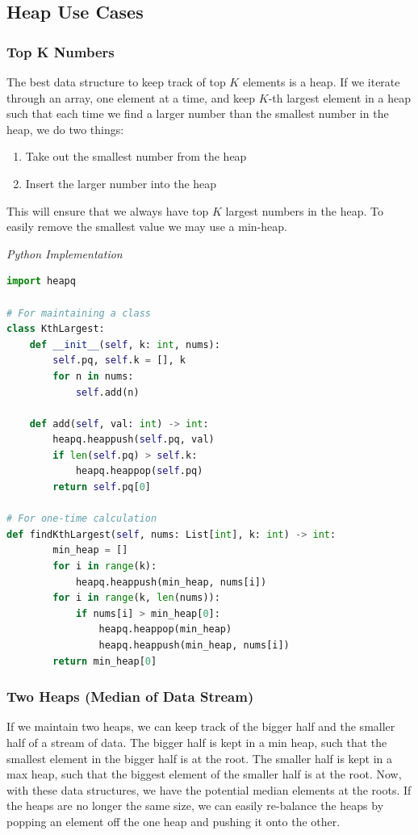 \documentclass{article}
\begin{document}
    \subsection{Heap Use Cases}
    \subsubsection{Top K Numbers}
    The best data structure to keep track of top $K$ elements is a heap. If we iterate through an array, one element at a time, and keep $K$-th largest element in a heap such that each time we find a larger number than the smallest number in the heap, we do two things:
    \begin{enumerate}
        \item Take out the smallest number from the heap
        \item Insert the larger number into the heap
    \end{enumerate}
    This will ensure that we always have top $K$ largest numbers in the heap. To easily remove the smallest value we may use a min-heap.

\vspace{8pt} \emph{Python Implementation}
\begin{lstlisting}[language=Python]
import heapq

# For maintaining a class
class KthLargest:
    def __init__(self, k: int, nums):
        self.pq, self.k = [], k
        for n in nums:
            self.add(n)

    def add(self, val: int) -> int:
        heapq.heappush(self.pq, val)
        if len(self.pq) > self.k:
            heapq.heappop(self.pq)
        return self.pq[0]

# For one-time calculation
def findKthLargest(self, nums: List[int], k: int) -> int:
        min_heap = []
        for i in range(k):
            heapq.heappush(min_heap, nums[i])
        for i in range(k, len(nums)):
            if nums[i] > min_heap[0]:
                heapq.heappop(min_heap)
                heapq.heappush(min_heap, nums[i])
        return min_heap[0]
\end{lstlisting}

    
    \subsubsection{Two Heaps (Median of Data Stream)}
    If we maintain two heaps, we can keep track of the bigger half and the smaller half of a stream of data. The bigger half is kept in a min heap, such that the smallest element in the bigger half is at the root. The smaller half is kept in a max heap, such that the biggest element of the smaller half is at the root. Now, with these data structures, we have the potential median elements at the roots. If the heaps are no longer the same size, we can easily re-balance the heaps by popping an element off the one heap and pushing it onto the other.
\end{document}
